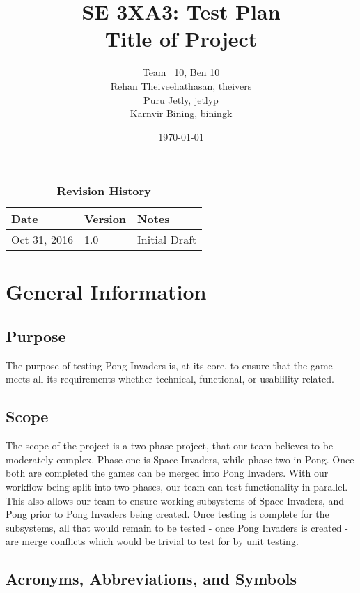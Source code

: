 \documentclass[12pt, titlepage]{article}
\title{SE 3XA3: Test Plan\\Title of Project}
\author{Team \ 10, Ben 10
		\\ Rehan Theiveehathasan, theivers
		\\ Puru Jetly, jetlyp
		\\ Karnvir Bining, biningk
}
\date{\today}
\begin{document}
\maketitle

\tableofcontents
\listoftables
\listoffigures

\begin{table}[bp]
\caption{\bf Revision History}
\begin{tabularx}{\textwidth}{p{3cm}p{2cm}X}
\toprule {\bf Date} & {\bf Version} & {\bf Notes}\\
\midrule
Oct 31, 2016 & 1.0 &  Initial Draft\\
\bottomrule
\end{tabularx}
\end{table}

\newpage


\section{General Information}

\subsection{Purpose}
The purpose of testing Pong Invaders is, at its core, to ensure that
the game meets all its requirements whether technical, functional, or usablility
related.


\subsection{Scope}
The scope of the project is a two phase project, that our team
believes to be moderately complex. Phase one is Space Invaders, while phase two
in Pong. Once both are completed the games can be merged into Pong Invaders.
With our workflow being split into two phases, our team can test functionality
in parallel. This also allows our team to ensure working subsystems of Space
Invaders, and Pong prior to Pong Invaders being created. Once testing is
complete for the subsystems, all that would remain to be tested - once Pong
Invaders is created - are merge conflicts which would be trivial to test for by
unit testing.

\subsection{Acronyms, Abbreviations, and Symbols}
	
\end{document}
